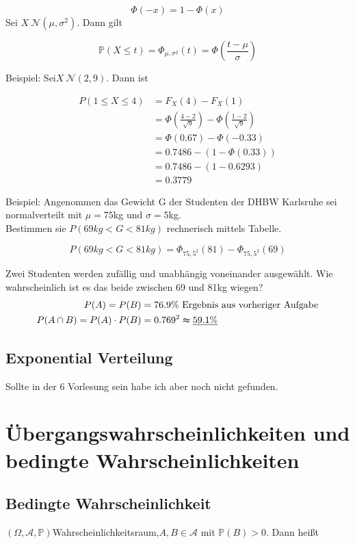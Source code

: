 \[\Phi(-x)=1-\Phi(x)\]
Sei $X~\mathcal{N} (\mu,\sigma^2)$. Dann gilt

\[\mathbb{P} (X\leq t)=\Phi_{\mu ,\sigma ^2}(t)=\Phi\left( \frac{t-\mu}{\sigma} \right)\]

Beispiel: Sei$X~\mathcal{N} (2,9)$. Dann ist

\begin{align}
    P(1\leq X\leq 4)&=F_X(4)-F_X(1)\\
    &=\Phi\left(\frac{4-2}{\sqrt{9}}\right)-\Phi\left(\frac{1-2}{\sqrt{9} } \right)\\
    &=\Phi(0.67)-\Phi(-0.33)\\
    &=0.7486-(1-\Phi(0.33))\\
    &=0.7486-(1-0.6293)\\
    &=0.3779
\end{align}

Beispiel: Angenommen das Gewicht G der Studenten der DHBW Karlsruhe sei normalverteilt mit $\mu =75$kg und $\sigma=5$kg.\\

Bestimmen sie $P(69kg<G<81kg)$ rechnerisch mittels Tabelle.

\[P(69kg<G<81kg)=\Phi_{75,5^2}(81)-\Phi_{75,5^2}(69)\]

Zwei Studenten werden zufällig und unabhängig voneinander ausgewählt. Wie wahrscheinlich ist es das beide zwischen 69 und 81kg wiegen?
\begin{align}
    P(A)=P(B)&=76.9\%\textrm{ Ergebnis aus vorheriger Aufgabe}\\
    P(A\cap B)=P(A)\cdot P(B)&=0.769^2\thickapprox \underline{59.1\% }
\end{align}


\subsection{Exponential Verteilung}

Sollte in der 6 Vorlesung sein habe ich aber noch nicht gefunden.

\section{Übergangswahrscheinlichkeiten und bedingte Wahrscheinlichkeiten}

\subsection{Bedingte Wahrscheinlichkeit}
$(\Omega ,\mathcal{A} ,\mathbb{P} )$Wahrscheinlichkeitsraum,$A,B\in \mathcal{A} $ mit $\mathbb{P} (B)>0$. Dann heißt

